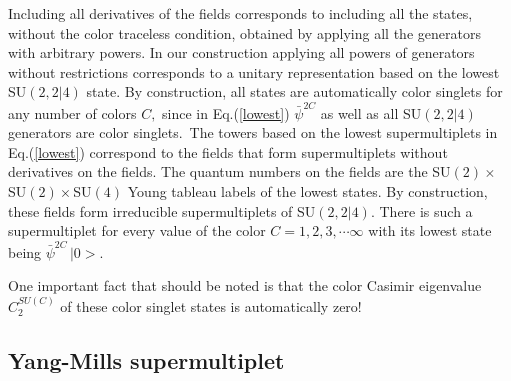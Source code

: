 \documentclass[a4paper,aps,preprint,nofootinbib]{revtex4}
\begin{document}
Including all derivatives of the fields corresponds to including all the
states, without the color traceless condition, obtained by applying all the
generators with arbitrary powers. In our construction applying all powers of
generators without restrictions corresponds to a unitary representation
based on the lowest SU$\left( 2,2|4\right) $ state. By construction, all
states are automatically color singlets for any number of colors $C,$ since
in Eq.(\ref{lowest}) $\bar{\psi}^{2C}$ as well as all SU$\left( 2,2|4\right)
$ generators are color singlets.\ The towers based on the lowest
supermultiplets in Eq.(\ref{lowest}) correspond to the fields that form
supermultiplets without derivatives on the fields$.$ The quantum numbers on
the fields are the SU$\left( 2\right) \times$SU$\left( 2\right) \times $SU$
\left( 4\right) $ Young tableau labels of the lowest states. By
construction, these fields form irreducible supermultiplets of SU$\left(
2,2|4\right) .$ There is such a supermultiplet for every value of the color $%
C=1,2,3,\cdots\infty$ with its lowest state being $\bar{\psi}^{2C}\,|0>.$

One important fact that should be noted is that the color Casimir eigenvalue
$C_{2}^{SU\left( C\right) }$ of these color singlet states is automatically
zero!

\subsection{Yang-Mills supermultiplet}
\end{document}
